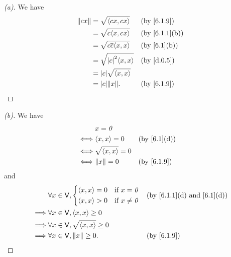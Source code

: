 \begin{proof}[(a)]
  We have
  \begin{align*}
    \norm{cx} & = \sqrt{\inn{cx, cx}}          &  & \by{6.1.9}    \\
              & = \sqrt{c \inn{x, cx}}         &  & \by{6.1.1}[b] \\
              & = \sqrt{c \conj{c} \inn{x, x}} &  & \by{6.1}[b]   \\
              & = \sqrt{\abs{c}^2 \inn{x, x}}  &  & \by{d.0.5}    \\
              & = \abs{c} \sqrt{\inn{x, x}}                       \\
              & = \abs{c} \norm{x}.            &  & \by{6.1.9}
  \end{align*}
\end{proof}

\begin{proof}[(b)]
  We have
  \begin{align*}
         & x = \zv                                \\
    \iff & \inn{x, x} = 0        &  & \by{6.1}[d] \\
    \iff & \sqrt{\inn{x, x}} = 0                  \\
    \iff & \norm{x} = 0          &  & \by{6.1.9}
  \end{align*}
  and
  \begin{align*}
             & \forall x \in \V, \begin{dcases}
                                   \inn{x, x} = 0 & \text{if } x = \zv    \\
                                   \inn{x, x} > 0 & \text{if } x \neq \zv
                                 \end{dcases}  &  & \text{(by \cref{6.1.1}(d) and \cref{6.1}(d))} \\
    \implies & \forall x \in \V, \inn{x, x} \geq 0                                                \\
    \implies & \forall x \in \V, \sqrt{\inn{x, x}} \geq 0                                         \\
    \implies & \forall x \in \V, \norm{x} \geq 0.         &  & \by{6.1.9}
  \end{align*}
\end{proof}

